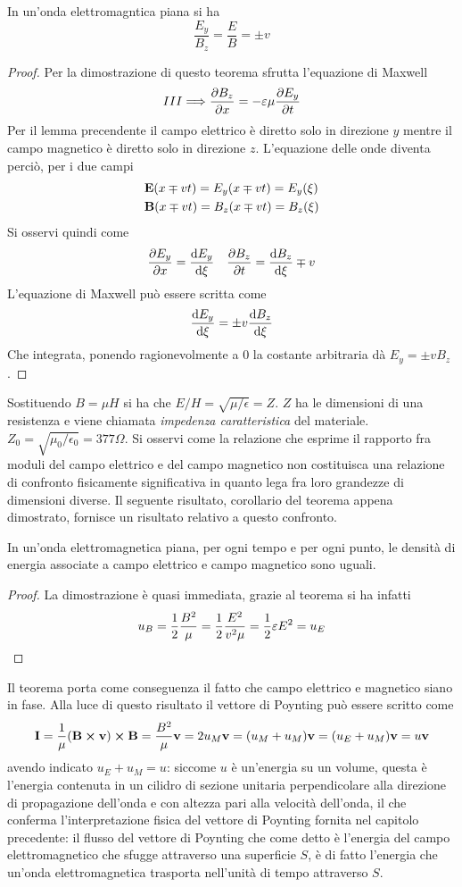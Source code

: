 \begin{lemma}
    In un'onda elettromagntica piana si ha
    \[
        \frac{E_y}{B_z}=\frac{E}{B}=\pm v
    \]
\end{lemma}
\begin{proof}
    Per la dimostrazione di questo teorema sfrutta l'equazione di Maxwell
    \[
        III    \Longrightarrow \pdv{B_z}{x}= -\varepsilon\mu \pdv{E_y}{t}
    \]
    Per il lemma precendente il campo elettrico è diretto solo in direzione $y$ mentre il campo magnetico è diretto solo in direzione $z$.
    L'equazione delle onde diventa perciò, per i due campi
    \[
        \begin{split}
            &\vb{E}(x\mp vt)=E_y(x\mp vt)=E_y(\xi)\\
            &\vb{B}(x\mp vt)=B_z(x\mp vt)=B_z(\xi)
        \end{split}
    \]
    Si osservi quindi come
    \[
        \pdv{E_y}{x}=\dv{E_y}{\xi}\quad \pdv{B_z}{t}=\dv{B_z}{\xi}\mp v
    \]
    L'equazione di Maxwell può essere scritta come
    \[
        \dv{E_y}{\xi}=\pm v \dv{B_z}{\xi}
    \]
    Che integrata, ponendo ragionevolmente a 0 la costante arbitraria dà $E_y=\pm v B_z$.
\end{proof}
Sostituendo $B=\mu H$ si ha che $E/H=\sqrt{\mu/\epsilon}=Z$. $Z$ ha le dimensioni di una resistenza e viene chiamata
\textit{impedenza caratteristica} del materiale. $Z_0=\sqrt{\mu_0/\epsilon_0}=377\Omega$.
Si osservi come la relazione che esprime il rapporto fra moduli del campo elettrico e del campo magnetico non costituisca una relazione
di confronto fisicamente significativa in quanto lega fra loro grandezze di dimensioni diverse.
Il seguente risultato, corollario del teorema appena dimostrato, fornisce un risultato relativo a questo confronto.
\begin{cor}
    In un'onda elettromagnetica piana, per ogni tempo e per ogni punto, le densità di energia associate a campo elettrico e
    campo magnetico sono uguali.
\end{cor}
\begin{proof}
    La dimostrazione è quasi immediata, grazie al teorema si ha infatti
    \[
        u_B=\frac{1}{2}\frac{B^2}{\mu}=\frac{1}{2}\frac{E^2}{v^2\mu}=\frac{1}{2}\varepsilon E^2=u_E
    \]
\end{proof}
Il teorema porta come conseguenza il fatto che campo elettrico e magnetico siano in fase.
Alla luce di questo risultato il vettore di Poynting può essere scritto come
\[
    \vb{I}=\rec{\mu} (\vb{B}\cp\vb{v})\cp\vb{B}=\frac{B^2}{\mu}\vb{v}=2u_M\vb{v}=(u_M+u_M)\vb{v}=(u_E+u_M)\vb{v}=u\vb{v}
\]
avendo indicato $u_E+u_M=u$: siccome $u$ è un'energia su un volume, questa è l'energia contenuta in un cilidro di
sezione unitaria perpendicolare alla direzione di propagazione dell'onda e con altezza pari alla velocità dell'onda,
il che conferma l'interpretazione fisica del vettore di Poynting fornita nel capitolo precedente:
il flusso del vettore di Poynting che come detto è l'energia del campo elettromagnetico che sfugge attraverso
una superficie $S$, è  di fatto l'energia che un'onda elettromagnetica trasporta nell'unità di tempo attraverso $S$.

